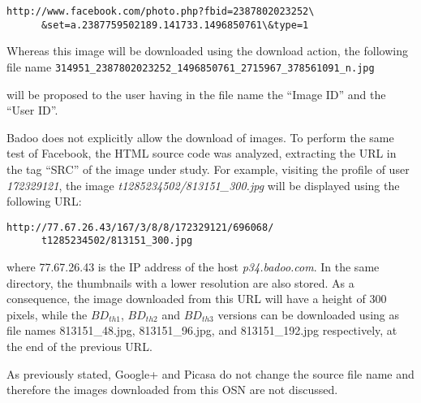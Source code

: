 \documentclass[10pt, conference]{IEEEtran}
\begin{document}
\scriptsize
\begin{verbatim}
http://www.facebook.com/photo.php?fbid=2387802023252\
      &set=a.2387759502189.141733.1496850761\&type=1
\end{verbatim}
\normalsize

\noindent Whereas this image will be downloaded using the download action, the following file name 
\scriptsize
\verb=314951_2387802023252_1496850761_2715967_378561091_n.jpg=
\normalsize

\noindent will be proposed to the user having in the file name the ``Image ID'' and the ``User ID''.

\noindent Badoo does not explicitly allow the download of images. To perform the same test of Facebook, the HTML source code was analyzed, extracting the URL in the tag ``SRC'' of the image under study.
For example, visiting the profile of user {\sl 172329121}, the image {\sl t1285234502/813151\_300.jpg} will be displayed using the following URL:

\scriptsize
\begin{verbatim}
http://77.67.26.43/167/3/8/8/172329121/696068/
      t1285234502/813151_300.jpg
\end{verbatim}
\normalsize
where 77.67.26.43 is the IP address of the host {\sl p34.badoo.com}.
In the same directory, the thumbnails with a lower resolution are also stored. As a consequence, the image downloaded from this URL will have a height of 300 pixels, while the $BD_{th1}$, $BD_{th2}$ and $BD_{th3}$ versions can be downloaded using as file names 813151\_48.jpg, 813151\_96.jpg, and 813151\_192.jpg respectively, at the end of the previous URL.

As previously stated, Google+ and Picasa do not change the source file name and therefore the images downloaded from this OSN are not discussed.
 
\end{document}
